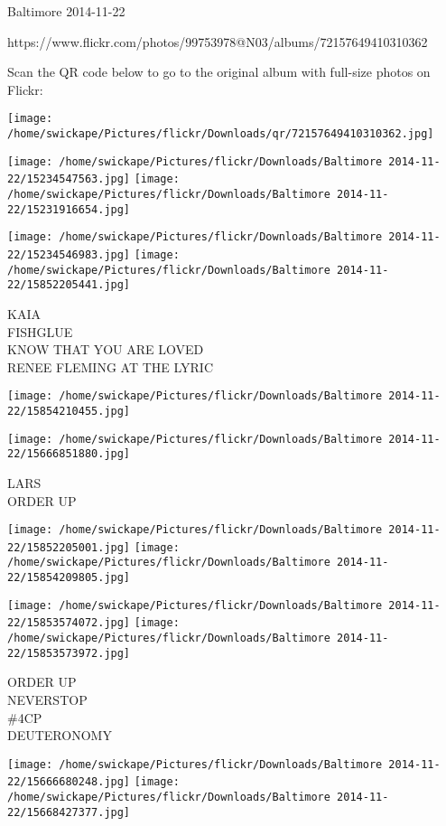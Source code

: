 \documentclass[10pt,letterpaper]{article}
\begin{document}
Baltimore 2014-11-22

https://www.flickr.com/photos/99753978@N03/albums/72157649410310362

Scan the QR code below to go to the original album with full-size photos on Flickr:

\texttt{[image: /home/swickape/Pictures/flickr/Downloads/qr/72157649410310362.jpg]}
\pagebreak

\texttt{[image: /home/swickape/Pictures/flickr/Downloads/Baltimore 2014-11-22/15234547563.jpg]}
\texttt{[image: /home/swickape/Pictures/flickr/Downloads/Baltimore 2014-11-22/15231916654.jpg]}

\texttt{[image: /home/swickape/Pictures/flickr/Downloads/Baltimore 2014-11-22/15234546983.jpg]}
\texttt{[image: /home/swickape/Pictures/flickr/Downloads/Baltimore 2014-11-22/15852205441.jpg]}

KAIA\\
FISHGLUE\\
KNOW THAT YOU ARE LOVED\\
RENEE FLEMING AT THE LYRIC\\
\pagebreak

\texttt{[image: /home/swickape/Pictures/flickr/Downloads/Baltimore 2014-11-22/15854210455.jpg]}

\vspace{0.25in}
\texttt{[image: /home/swickape/Pictures/flickr/Downloads/Baltimore 2014-11-22/15666851880.jpg]}

LARS\\
ORDER UP\\
\pagebreak

\texttt{[image: /home/swickape/Pictures/flickr/Downloads/Baltimore 2014-11-22/15852205001.jpg]}
\texttt{[image: /home/swickape/Pictures/flickr/Downloads/Baltimore 2014-11-22/15854209805.jpg]}

\texttt{[image: /home/swickape/Pictures/flickr/Downloads/Baltimore 2014-11-22/15853574072.jpg]}
\texttt{[image: /home/swickape/Pictures/flickr/Downloads/Baltimore 2014-11-22/15853573972.jpg]}

ORDER UP\\
NEVERSTOP\\
\#4CP\\
DEUTERONOMY\\
\pagebreak

\texttt{[image: /home/swickape/Pictures/flickr/Downloads/Baltimore 2014-11-22/15666680248.jpg]}
\texttt{[image: /home/swickape/Pictures/flickr/Downloads/Baltimore 2014-11-22/15668427377.jpg]}
\end{document}
